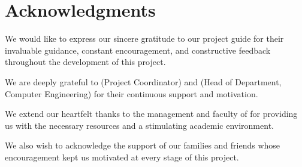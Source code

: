 
\newpage
\chapter*{Acknowledgments}

\justify
We would like to express our sincere gratitude to our project guide \textbf{\Supervisor} for their invaluable guidance, constant encouragement, and constructive feedback throughout the development of this project.

We are deeply grateful to \textbf{\ProjectCoordinator} (Project Coordinator) and \textbf{\HoD} (Head of Department, Computer Engineering) for their continuous support and motivation.

We extend our heartfelt thanks to the management and faculty of \textbf{\Institution} for providing us with the necessary resources and a stimulating academic environment.

We also wish to acknowledge the support of our families and friends whose encouragement kept us motivated at every stage of this project.

\vspace{2cm}

\begin{flushright}
    \textbf{\AuthorOne} \\[0.3em]
    \textbf{\AuthorTwo} \\[0.3em]
    \textbf{\AuthorThree}
\end{flushright}

